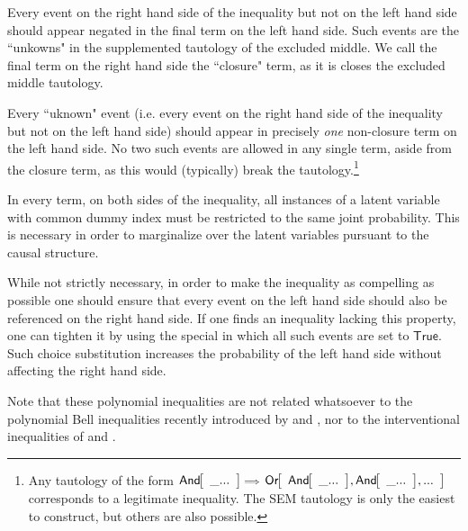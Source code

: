 \begin{compactitem}[$\bullet$]
\item Every event on the right hand side of the inequality but not on the left hand side should appear negated in the final term on the left hand side. Such events are the ``unkowns" in the supplemented tautology of the excluded middle. 
We call the final term on the right hand side the ``closure" term, as it is closes the excluded middle tautology.

\item Every ``uknown" event (i.e. every event on the right hand side of the inequality but not on the left hand side) should appear in precisely \emph{one} non-closure term on the left hand side. No two such events are allowed in any single term, aside from the closure term, as this would (typically) break the tautology.\footnote{Any tautology of the form $\NamedFunction{And}{\_...}\cramp{\scriptstyle\implies}\NamedFunction{Or}{\NamedFunction{And}{\_...},\NamedFunction{And}{\_...},...}$ corresponds to a legitimate inequality. The SEM tautology is only the easiest to construct, but others are also possible.}

\item In every term, on both sides of the inequality, all instances of a latent variable with common dummy index must be restricted to the same joint probability. This is necessary in order to marginalize over the latent variables pursuant to the causal structure.
\end{compactitem}

While not strictly necessary, in order to make the inequality as compelling as possible one should ensure that every event on the left hand side should also be referenced on the right hand side. If one finds an inequality lacking this property, one can tighten it by using the special in which all such events are set to $\mathsf{True}$. Such choice substitution increases the probability of the left hand side without affecting the right hand side.

Note that these polynomial inequalities are not related whatsoever to the polynomial Bell inequalities recently introduced by \citet{ChavesPolynomial} and \citet{RossetNetworks}, nor to the interventional inequalities of \citet{kang2007polynomialconstraints} and \citet{steeg2011relaxation}.













